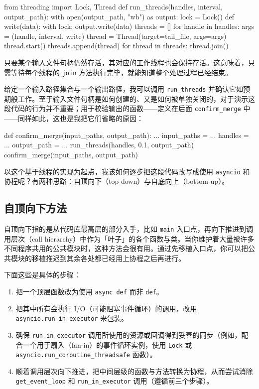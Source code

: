 \begin{codebox}[python]
from threading import Lock, Thread
def run_threads(handles, interval, output_path):
    with open(output_path, "wb") as output:
        lock = Lock()
        def write(data):
            with lock:
                output.write(data)
        threads = []
        for handle in handles:
            args = (handle, interval, write)
            thread = Thread(target=tail_file, args=args)
            thread.start()
            threads.append(thread)
        for thread in threads:
            thread.join()
\end{codebox}

只要某个输入文件句柄仍然存活，其对应的工作线程也会保持存活。这意味着，只需等待每个线程的 \texttt{join} 方法执行完毕，就能知道整个处理过程已经结束。

给定一个输入路径集合与一个输出路径，我可以调用 \texttt{run\_threads} 并确认它如预期般工作。至于输入文件句柄是如何创建的、又是如何被单独关闭的，对于演示这段代码的行为并不重要；用于校验输出的函数——定义在后面 \texttt{confirm\_merge} 中——同样如此，这也是我把它们省略的原因：

\begin{codebox}[python]
def confirm_merge(input_paths, output_path):
    ...
input_paths = ...
handles = ...
output_path = ...
run_threads(handles, 0.1, output_path)
confirm_merge(input_paths, output_path)
\end{codebox}

以这个基于线程的实现为起点，我该如何逐步把这段代码改写成使用 \texttt{asyncio} 和协程呢？有两种思路：自顶向下（top-down）与自底向上（bottom-up）。

\subsection{自顶向下方法}

自顶向下指的是从代码库最高层的部分入手，比如 \texttt{main} 入口点，再向下推进到调用层次（call hierarchy）中作为「叶子」的各个函数与类。当你维护着大量被许多不同程序共用的公共模块时，这种方法会很有用。通过先移植入口点，你可以把公共模块的移植推迟到其余各处都已经用上协程之后再进行。

下面这些是具体的步骤：

\begin{enumerate}
\item 把一个顶层函数改为使用 \texttt{async def} 而非 \texttt{def}。
\item 把其中所有会执行 I/O（可能阻塞事件循环）的调用，改用 \texttt{asyncio.run\_in\_executor} 来包装。
\item 确保 \texttt{run\_in\_executor} 调用所使用的资源或回调得到妥善的同步（例如，配合一个用于扇入（fan-in）的事件循环实例，使用 \texttt{Lock} 或 \texttt{asyncio.run\_coroutine\_threadsafe} 函数）。
\item 顺着调用层次向下推进，把中间层级的函数与方法转换为协程，从而尝试消除 \texttt{get\_event\_loop} 和 \texttt{run\_in\_executor} 调用（遵循前三个步骤）。
\end{enumerate}

